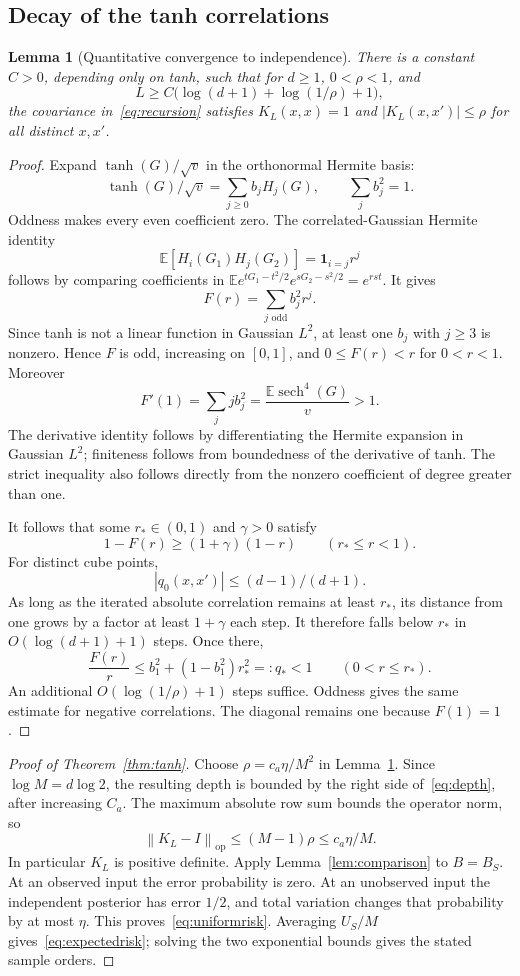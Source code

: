 \documentclass[11pt]{article}
\newtheorem{lemma}[theorem]{Lemma}
\theoremstyle{remark}\newtheorem{remark}[theorem]{Remark}
\newcommand{\E}{\mathbb E}
\newcommand{\norm}[1]{\left\lVert#1\right\rVert}
\newcommand{\abs}[1]{\left|#1\right|}
\begin{document}
\subsection{Decay of the tanh correlations}
\begin{lemma}[Quantitative convergence to independence]\label{lem:decay}
There is a constant $C>0$, depending only on tanh, such that for $d\ge1$, $0<\rho<1$, and
\[
 L\ge C\bigl(\log(d+1)+\log(1/\rho)+1\bigr),
\]
the covariance in~\eqref{eq:recursion} satisfies $K_L(x,x)=1$ and $\abs{K_L(x,x')}\le\rho$ for all distinct $x,x'$.
\end{lemma}
\begin{proof}
Expand $\tanh(G)/\sqrt v$ in the orthonormal Hermite basis:
\[
 \tanh(G)/\sqrt v=\sum_{j\ge0}b_jH_j(G),\qquad
 \sum_jb_j^2=1.
\]
Oddness makes every even coefficient zero. The correlated-Gaussian Hermite identity
\[
 \E[H_i(G_1)H_j(G_2)]=\mathbf1_{i=j}r^j
\]
follows by comparing coefficients in $\E e^{tG_1-t^2/2}e^{sG_2-s^2/2}=e^{rst}$. It gives
\[
 F(r)=\sum_{j\text{ odd}}b_j^2r^j.
\]
Since tanh is not a linear function in Gaussian $L^2$, at least one $b_j$ with $j\ge3$ is nonzero. Hence $F$ is odd, increasing on $[0,1]$, and $0\le F(r)<r$ for $0<r<1$. Moreover
\[
 F'(1)=\sum_jj b_j^2
 =\frac{\E\operatorname{sech}^4(G)}{v}>1.
\]
The derivative identity follows by differentiating the Hermite expansion in Gaussian $L^2$; finiteness follows from boundedness of the derivative of tanh. The strict inequality also follows directly from the nonzero coefficient of degree greater than one.

It follows that some $r_*\in(0,1)$ and $\gamma>0$ satisfy
\[
 1-F(r)\ge(1+\gamma)(1-r)\qquad(r_*\le r<1).
\]
For distinct cube points,
\[
 \abs{q_0(x,x')}\le (d-1)/(d+1).
\]
As long as the iterated absolute correlation remains at least $r_*$, its distance from one grows by a factor at least $1+\gamma$ each step. It therefore falls below $r_*$ in $O(\log(d+1)+1)$ steps. Once there,
\[
 \frac{F(r)}r\le b_1^2+(1-b_1^2)r_*^2=:q_*<1
 \qquad(0<r\le r_*).
\]
An additional $O(\log(1/\rho)+1)$ steps suffice. Oddness gives the same estimate for negative correlations. The diagonal remains one because $F(1)=1$.
\end{proof}
\begin{proof}[Proof of Theorem~\ref{thm:tanh}]
Choose $\rho=c_a\eta/M^2$ in Lemma~\ref{lem:decay}. Since $\log M=d\log2$, the resulting depth is bounded by the right side of~\eqref{eq:depth}, after increasing $C_a$. The maximum absolute row sum bounds the operator norm, so
\[
 \norm{K_L-I}_{\mathrm{op}}\le (M-1)\rho\le c_a\eta/M.
\]
In particular $K_L$ is positive definite. Apply Lemma~\ref{lem:comparison} to $B=B_S$. At an observed input the error probability is zero. At an unobserved input the independent posterior has error $1/2$, and total variation changes that probability by at most $\eta$. This proves~\eqref{eq:uniformrisk}. Averaging $U_S/M$ gives~\eqref{eq:expectedrisk}; solving the two exponential bounds gives the stated sample orders.
\end{proof}
\end{document}
